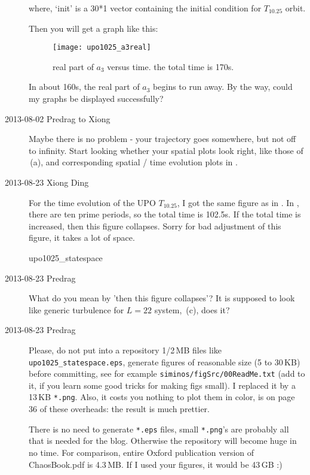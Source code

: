 \begin{description}
where, `init' is a 30*1 vector containing the initial condition for $T_{10.25}$
orbit.

Then you will get a graph like this:
\begin{figure}[h]
 \centering
 \captionsetup{width=.6\textwidth}
 \texttt{[image: upo1025\_a3real]}
 \caption{real part of $a_3$ versus time. the total time is 170s.}
 \label{xiong_upo1025_a3real}
\end{figure}

In about 160s, the real part of $a_3$ begins to run away.
By the way, could my graphs be displayed successfully?

\item[2013-08-02 Predrag to Xiong]
Maybe there is no problem - your trajectory goes somewhere, but
not off to infinity. Start looking whether your spatial plots look right, like
those of \,(a), and corresponding spatial / time evolution
plots in .

\item[2013-08-23 Xiong Ding]
For the time evolution of the UPO $T_{10.25}$, I got the same figure as in
. In , there are ten
prime periods, so the total time is 102.5s. If the total time is increased,
then this figure collapses. Sorry for bad adjustment of this figure, it takes
a lot of space.

{upo1025_statespace}

\item[2013-08-23 Predrag]
What do you mean by 'then this figure collapses'?
It is supposed to look like generic turbulence for
$L=22$ system, \,(c), does it?

\item[2013-08-23 Predrag]
Please, do not put into a repository 1/2\,MB files like
\\
\texttt{upo1025\_statespace.eps},
generate figures of reasonable size (5 to 30\,KB) before committing,
see for example \texttt{siminos/figSrc/00ReadMe.txt}
(add to it, if you learn some good tricks for making figs small).
I replaced it by a 13\,KB \texttt{*.png}. Also, it costs you nothing
to plot them in color, is on page 36 of
{these overheads}: the result is much prettier.

There is no need to generate \texttt{*.eps} files, small \texttt{*.png}'s are probably all
that is needed for the blog. Otherwise
the repository will become huge in no time. For comparison, entire Oxford publication
version of ChaosBook.pdf
is 4.3\,MB. If I used your figures, it would be 43\,GB :)


\end{description}
